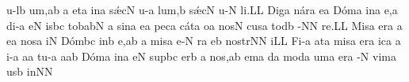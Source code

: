 \sgn {}u{-l}\punctum b\egn
\sgn {}u{m,}\punctum a\augmentum b\egn
\spatium\divisiominor\spatium
\custos a
\lineaproxima
\sgn {}et\punctum a\egn
\spatium
\sgn {}in\punctum a\egn
\spatium\sgn s{\'\ae}c\punctum N\egn
\sgn {}u-\punctum a\egn
\sgn lu{m,}\punctum b\egn
\spatium
\sgn s{\'\ae}c\punctum N\egn
\sgn {}u-\punctum N\egn
\sgn li.\punctum L\augmentum L\egn
\spatium
\divisiofinalis
\spatium
\sgn Dig\punctum a\egn
\sgn n{\'a}r\punctum a\egn
\sgn {}e{}\punctum a\egn
\spatium
\sgn D{\'o}m\punctum a\egn
\sgn {}in\punctum a\egn
\sgn {}e,\punctum a\egn
\spatium\sgn di-\punctum a\egn
\sgn {}e{}\punctum N\egn
\spatium
\sgn {}is\pes bc\egn
\sgn to{}\clivis ba\augmentumduplex bN\egn
\spatium\divisiominor\spatium
\custos a
\lineaproxima
\sgn sin\punctum a\egn
\sgn {}e{}\punctum a\egn
\spatium\sgn pec\punctum a\egn
\sgn c{\'a}t\punctum a\egn
\sgn {}o{}\punctum a\egn
\spatium
\sgn nos\punctum N\egn
\spatium\sgn cus\punctum a\egn
\sgn tod\punctum b\egn
\sgn {}{\'\i}-\punctum N\augmentum N\egn
\sgn re.\punctum L\augmentum L\egn
\spatium\divisiofinalis\spatium
\sgn Mis\punctum a\egn
\sgn {}e{r}\punctum a\egn
{}\punctum a\egn
\sgn {}e{}\punctum a\egn
\spatium
\sgn nos\punctum a\egn
{}i{}\punctum N\egn
\spatium\sgn D{\'o}m\pes bc\egn
\sgn {}in\punctum b\egn
\sgn {}e,\punctum a\augmentum b\egn
\spatium\divisiominor\spatium
\custos a
\lineaproxima
\sgn mis\punctum a\egn
\sgn {}e{-}\punctum N\egn
{}r\engl{}\punctum a\egn
\sgn {}e{}\punctum b\egn
\spatium
\sgn no{str}\punctum N\augmentum N\egn
\sgn {}i{}\punctum L\augmentum L\egn
\spatium\divisiofinalis\spatium
\sgn Fi-\punctum a\egn
\sgn {}at\punctum a\egn
\spatium
\sgn mis\punctum a\egn
\sgn {}er\punctum a\egn
\sgn {}ic\punctum a\egn
{}\punctum a\egn
\sgn {}i-\punctum a\egn
\sgn {}a{}\punctum a\egn
\spatium
\sgn tu-\punctum a\egn
\sgn {}a{}\punctum a\augmentum b\egn
\spatium
\sgn D{\'o}m\punctum a\egn
\sgn {}in\punctum a\egn
\sgn {}e{}\punctum N\egn
\spatium
\sgn sup\pes bc\egn
\sgn {}er\punctum b\egn
\spatium
\custos a
\lineaproxima
\sgn no{s,}\punctum a\augmentum b\egn
\spatium
\divisiominor
\spatium
{}em\punctum a\egn
{}d\punctum a\egn
\sgn mod\punctum a\egn
\sgn {}um\punctum a\egn
\spatium
{}er\punctum a\egn
{}-\punctum N\egn
\sgn vim\punctum a\egn
\sgn {}us\punctum b\egn
\spatium
\sgn {}in\punctum N\augmentum N\egn

